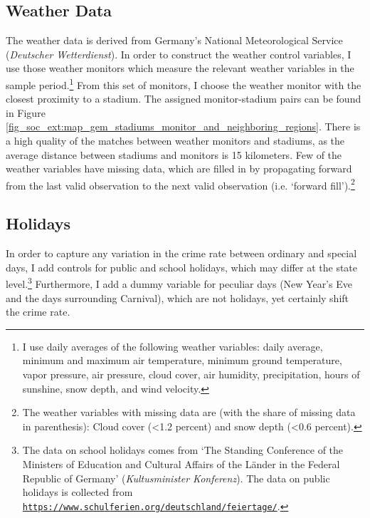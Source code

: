 \subsection{Weather Data}
The weather data is derived from Germany's National Meteorological Service (\textit{Deutscher Wetterdienst}). In order to construct the weather control variables, I use those weather monitors which measure the relevant weather variables in the sample period.\footnote{I use daily averages of the following weather variables: daily average, minimum and maximum air temperature, minimum ground temperature, vapor pressure, air pressure, cloud cover, air humidity, precipitation, hours of sunshine, snow depth, and wind velocity.} From this set of monitors, I choose the weather monitor with the closest proximity to a stadium. The assigned monitor-stadium pairs can be found in Figure \ref{fig_soc_ext:map_gem_stadiums_monitor_and_neighboring_regions}. There is a high quality of the matches between weather monitors and stadiums, as the average distance between stadiums and monitors is 15 kilometers. Few of the weather variables have missing data, which are filled in by propagating forward from the last valid observation to the next valid observation (i.e. `forward fill').\footnote{The weather variables with missing data are (with the share of missing data in parenthesis): Cloud cover (<1.2 percent) and snow depth (<0.6 percent).}


\subsection{Holidays}
In order to capture any variation in the crime rate between ordinary and special days, I add controls for public and school holidays, which may differ at the state level.\footnote{The data on school holidays comes from `The Standing Conference of the Ministers of Education and Cultural Affairs of the Länder in the Federal Republic of Germany' (\textit{Kultusminister Konferenz}). The data on public holidays is collected from \href{https://www.schulferien.org/deutschland/feiertage/}{\tt https://www.schulferien.org/deutschland/feiertage/}.} Furthermore, I add a dummy variable for peculiar days (New Year's Eve and the days surrounding Carnival), which are not holidays, yet certainly shift the crime rate.



